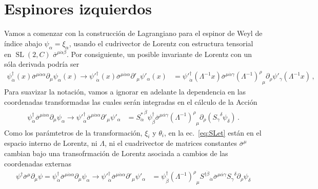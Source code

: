 \section{Espinores izquierdos}
\begin{frame}
Vamos a comenzar con la construcción de Lagrangiano para el espinor de Weyl de índice abajo
$\psi_{\alpha}=\xi_{\alpha}$, usando el cudrivector de Lorentz con estructura tensorial en $\operatorname{SL}(2,C)$ $\overline{\sigma}^{\mu\dot{\alpha}\beta}$.
Por consiguiente, un posible invariante de Lorentz con un sóla derivada podría ser
 \begin{align}
   {\psi}^{\dagger}_{\dot{\alpha}}(x)\overline{\sigma}^{\mu\dot{\alpha}\alpha}\partial_\mu\psi_{\alpha}(x)\to  {\psi'}^{\dagger}_{\dot{\alpha}}(x)\overline{\sigma}^{\mu\dot{\alpha}\alpha}\partial'_\mu\psi'_{\alpha}(x)
&={\psi'}^{\dagger}_{\dot{\alpha}}(\Lambda^{-1}x)\overline{\sigma}^{\mu\dot{\alpha}\gamma}{\left(\Lambda^{-1}\right)^\rho}_\mu\partial_\rho \psi'_{\gamma}(\Lambda^{-1}x)\,,
\end{align}
Para suavizar la notación, vamos a ignorar en adelante la dependencia en las coordenadas transformadas las cuales serán integradas en el cálculo de la Acción
\begin{align}
     {\psi}^{\dagger}_{\dot{\alpha}}\overline{\sigma}^{\mu\dot{\alpha}\alpha}\partial_\mu\psi_{\alpha}\to  {\psi'}^{\dagger}_{\dot{\alpha}}\overline{\sigma}^{\mu\dot{\alpha}\alpha}\partial'_\mu\psi'_{\alpha}
&=
 {S^*_{\dot{\alpha}}}^{\dot{\beta}}{\psi}^{\dagger}_{\dot{\beta}}\overline{\sigma}^{\mu\dot{\alpha\gamma}}{\left(\Lambda^{-1}\right)^\rho}_\mu\partial_\rho \left( {S_{\gamma}}^{\delta}\psi_\delta \right)\,.
 \end{align} 
 Como los parámtetros de la transformación, $\xi_i$ y $\theta_i$, en la ec.~\eqref{eq:SLet} están en el espacio interno de Lorentz, 
 ni $\Lambda$, ni el cuadrivector de matrices constantes $\overline{\sigma}^{\mu}$ cambian bajo una transofrmación de Lorentz asociada a cambios de las coordenadas externas
\begin{align}
  {\psi}^{\dagger}\overline{\sigma}^\mu\partial_\mu\psi
  =    {\psi}^{\dagger}_{\dot{\alpha}}\overline{\sigma}^{\mu\dot{\alpha}\alpha}\partial_\mu\psi_{\alpha}\to  {\psi'}^{\dagger}_{\dot{\alpha}}\overline{\sigma}^{\mu\dot{\alpha}\alpha}\partial'_\mu\psi'_{\alpha}&=
{\psi}^{\dagger}_{\dot{\beta}}{\left(\Lambda^{-1}\right)^\rho}_\mu {S^{\dagger\dot{\beta}}}_{\dot{\alpha}}\overline{\sigma}^{\mu\dot{\alpha\gamma}}{S_{\gamma}}^{\delta} \partial_\rho  \psi_\delta \nonumber\\

\end{align}
\end{frame}
